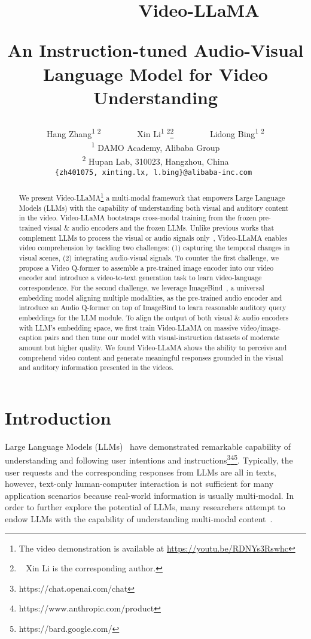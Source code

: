\documentclass[11pt]{article}
\title{\logo \ \ \ \ \ \ \ \   \  Video-LLaMA 

An Instruction-tuned Audio-Visual Language Model for Video Understanding}
\author{
Hang Zhang\textsuperscript{\rm 1 \rm2}  \ \ \ \ \ \ \ \ 
Xin Li\textsuperscript{\rm 1  \rm2}\thanks{~ Xin Li is the corresponding author.} \ \ \ \ \ \ \ \ 
Lidong Bing\textsuperscript{\rm1 \rm 2} \\
\textsuperscript{\rm 1} 
DAMO Academy, Alibaba Group \\
\textsuperscript{\rm 2}
Hupan Lab, 310023, Hangzhou, China \\
\tt{\{zh401075, xinting.lx, l.bing\}@alibaba-inc.com} 
}
\begin{document}
\maketitle
\begin{abstract}
We present Video-LLaMA\footnote{The video demonstration is available at \url{https://youtu.be/RDNYs3Rswhc}} a multi-modal framework that empowers Large Language Models (LLMs) with the capability of understanding both visual and auditory content in the video. Video-LLaMA bootstraps cross-modal training from the frozen pre-trained visual \& audio encoders and the frozen LLMs. Unlike previous works that complement LLMs to process the visual or audio signals only~\citep{zhu2023minigpt,liu2023visualit,huang2023audiogpt}, Video-LLaMA enables video comprehension by tackling two challenges: (1) capturing the temporal changes in visual scenes, (2) integrating audio-visual signals. To counter the first challenge, we propose a Video Q-former to assemble a pre-trained image encoder into our video encoder and introduce a video-to-text generation task to learn video-language correspondence. For the second challenge, we leverage ImageBind~\citep{girdhar2023imagebind}, a universal embedding model aligning multiple modalities, as the pre-trained audio encoder and introduce an Audio Q-former on top of ImageBind to learn reasonable auditory query embeddings for the LLM module. To align the output of both visual \& audio encoders with LLM's embedding space, we first train Video-LLaMA on massive video/image-caption pairs and then tune our model with visual-instruction datasets of moderate amount but higher quality. We found Video-LLaMA shows the ability to perceive and comprehend video content and generate meaningful responses grounded in the visual and auditory information presented in the videos.  \end{abstract}

\section{Introduction}


Large Language Models (LLMs)~\citep{chowdhery2022palm,bai2022constitutional,openai2023gpt4tr} have demonstrated remarkable capability of understanding and following user intentions and instructions\footnote{https://chat.openai.com/chat}\footnote{https://www.anthropic.com/product}\footnote{https://bard.google.com/}. Typically, the user requests and the corresponding responses from LLMs are all in texts, however, text-only human-computer interaction is not sufficient for many application scenarios because real-world information is usually multi-modal. In order to further explore the potential of LLMs, many researchers attempt to endow LLMs with the capability of understanding multi-modal content~\citep{huang2023audiogpt,zhang2023speechgpt,yin2023survey}. 
\end{document}
